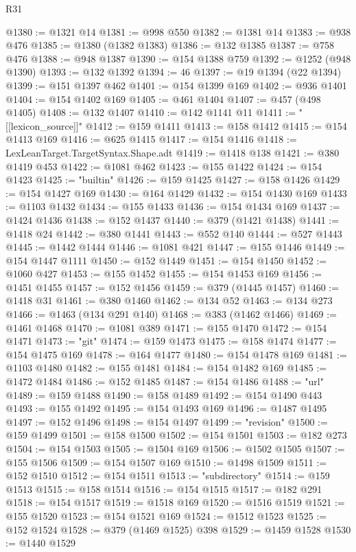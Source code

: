 \begin{lexlean}{R31}
\begin{coremodule}
@1380 := @1321 @14
@1381 := @998 @550
@1382 := @1381 @14
@1383 := @938 @476
@1385 := @1380 (@1382 @1383)
@1386 := @132 @1385
@1387 := @758 @476
@1388 := @948 @1387
@1390 := @154 @1388 @759
@1392 := @1252 (@948 @1390)
@1393 := @132 @1392
@1394 := 46
@1397 := @19 @1394 (@22 @1394)
@1399 := @151 @1397 @462
@1401 := @154 @1399 @169
@1402 := @936 @1401
@1404 := @154 @1402 @169
@1405 := @461 @1404
@1407 := @457 (@498 @1405)
@1408 := @132 @1407
@1410 := @142 @1141 @11
@1411 := "[[lexicon_source]]"
@1412 := @159 @1411
@1413 := @158 @1412
@1415 := @154 @1413 @169
@1416 := @625 @1415
@1417 := @154 @1416
@1418 := LexLeanTarget.TargetSyntax.Shape.adt
@1419 := @1418 @138
@1421 := @380 @1419 @453
@1422 := @1081 @462
@1423 := @155 @1422
@1424 := @154 @1423
@1425 := "builtin"
@1426 := @159 @1425
@1427 := @158 @1426
@1429 := @154 @1427 @169
@1430 := @164 @1429
@1432 := @154 @1430 @169
@1433 := @1103 @1432
@1434 := @155 @1433
@1436 := @154 @1434 @169
@1437 := @1424 @1436
@1438 := @152 @1437
@1440 := @379 (@1421 @1438)
@1441 := @1418 @24
@1442 := @380 @1441
@1443 := @552 @140
@1444 := @527 @1443
@1445 := @1442 @1444
@1446 := @1081 @421
@1447 := @155 @1446
@1449 := @154 @1447 @1111
@1450 := @152 @1449
@1451 := @154 @1450
@1452 := @1060 @427
@1453 := @155 @1452
@1455 := @154 @1453 @169
@1456 := @1451 @1455
@1457 := @152 @1456
@1459 := @379 (@1445 @1457)
@1460 := @1418 @31
@1461 := @380 @1460
@1462 := @134 @52
@1463 := @134 @273
@1466 := @1463 (@134 @291 @140)
@1468 := @383 (@1462 @1466)
@1469 := @1461 @1468
@1470 := @1081 @389
@1471 := @155 @1470
@1472 := @154 @1471
@1473 := "git"
@1474 := @159 @1473
@1475 := @158 @1474
@1477 := @154 @1475 @169
@1478 := @164 @1477
@1480 := @154 @1478 @169
@1481 := @1103 @1480
@1482 := @155 @1481
@1484 := @154 @1482 @169
@1485 := @1472 @1484
@1486 := @152 @1485
@1487 := @154 @1486
@1488 := "url"
@1489 := @159 @1488
@1490 := @158 @1489
@1492 := @154 @1490 @443
@1493 := @155 @1492
@1495 := @154 @1493 @169
@1496 := @1487 @1495
@1497 := @152 @1496
@1498 := @154 @1497
@1499 := "revision"
@1500 := @159 @1499
@1501 := @158 @1500
@1502 := @154 @1501
@1503 := @182 @273
@1504 := @154 @1503
@1505 := @1504 @169
@1506 := @1502 @1505
@1507 := @155 @1506
@1509 := @154 @1507 @169
@1510 := @1498 @1509
@1511 := @152 @1510
@1512 := @154 @1511
@1513 := "subdirectory"
@1514 := @159 @1513
@1515 := @158 @1514
@1516 := @154 @1515
@1517 := @182 @291
@1518 := @154 @1517
@1519 := @1518 @169
@1520 := @1516 @1519
@1521 := @155 @1520
@1523 := @154 @1521 @169
@1524 := @1512 @1523
@1525 := @152 @1524
@1528 := @379 (@1469 @1525) @398
@1529 := @1459 @1528
@1530 := @1440 @1529

\end{coremodule}
\end{lexlean}
